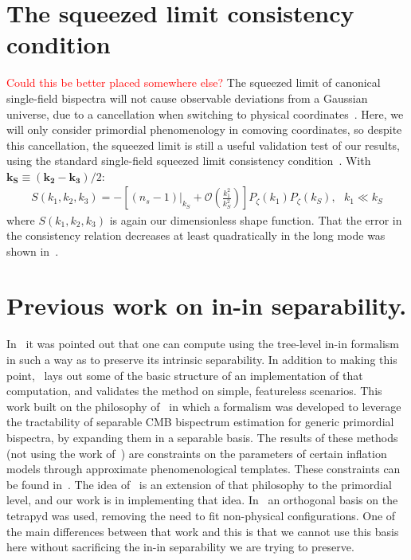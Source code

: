     \section{The squeezed limit consistency condition}
    \textcolor{red}
    {Could this be better placed somewhere else?}
The squeezed limit of canonical single-field bispectra will not cause
observable deviations from a Gaussian universe,
due to a cancellation when switching to physical coordinates~\cite{Cabass_2016}.
Here, we will only consider primordial phenomenology
in comoving coordinates, so despite this cancellation,
the squeezed limit is still a useful validation test of our results,
using the standard single-field squeezed limit consistency condition~\cite{sqz_consistency,not_so_sqz}.
With $\mathbf{k_S}\equiv\left(\mathbf{k_2}-\mathbf{k_3}\right)/2 $:
\begin{align}\label{eq:sqz_consistency}
    S(k_1,k_2,k_3) = -\left[(n_s-1)|_{k_S}+\mathcal{O}\left(\frac{k_1^2}{k_S^2}\right)\right]P_{\zeta}(k_1)P_{\zeta}(k_S),
\ \ \  k_1\ll k_S
\end{align}
where $S(k_1,k_2,k_3)$ is again our dimensionless shape function.
That the error in the consistency relation decreases at least quadratically
in the long mode was shown in~\cite{not_so_sqz}.



\section{Previous work on in-in separability.}
    In~\cite{Funakoshi} it was pointed out that one can compute using the
tree-level in-in formalism in such a way as to preserve its intrinsic
separability. In addition to making this point,~\cite{Funakoshi} lays
out some of the basic structure of an implementation of that computation,
and validates the method on simple, featureless scenarios.
This work built on the philosophy of~\cite{FergShell_1,FergShell_2,FergShell_3}
in which a formalism was developed to
leverage the tractability of separable CMB bispectrum estimation
for generic primordial bispectra, by expanding them in a separable basis.
The results of these methods (not using the work of~\cite{Funakoshi})
are constraints on the parameters of certain inflation models through approximate
phenomenological templates.
These constraints can be found in~\cite{Planck_NG_2015, Planck_NG_2018}.
The idea of~\cite{Funakoshi} is an extension of that philosophy to the primordial level,
and our work is in implementing that idea.
In~\cite{FergShell_1,FergShell_2,FergShell_3} an orthogonal basis on the tetrapyd was used,
removing the need to fit non-physical configurations.
One of the main differences between that work and this
is that we cannot use this basis here without sacrificing the
in-in separability we are trying to preserve.

